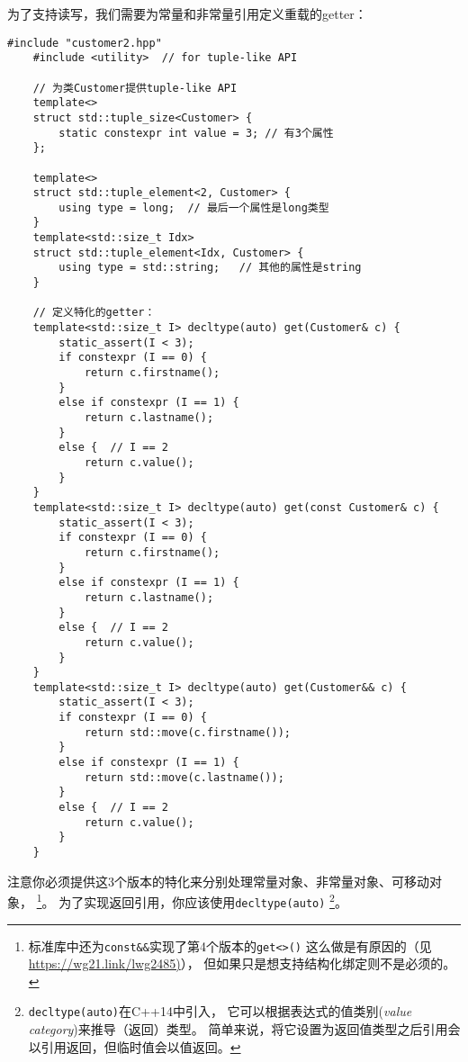 为了支持读写，我们需要为常量和非常量引用定义重载的getter：
\begin{lstlisting}[frame=single, title=lang/structbind2.hpp]
    #include "customer2.hpp"
    #include <utility>  // for tuple-like API

    // 为类Customer提供tuple-like API
    template<>
    struct std::tuple_size<Customer> {
        static constexpr int value = 3; // 有3个属性
    };

    template<>
    struct std::tuple_element<2, Customer> {
        using type = long;  // 最后一个属性是long类型
    }
    template<std::size_t Idx>
    struct std::tuple_element<Idx, Customer> {
        using type = std::string;   // 其他的属性是string
    }

    // 定义特化的getter：
    template<std::size_t I> decltype(auto) get(Customer& c) {
        static_assert(I < 3);
        if constexpr (I == 0) {
            return c.firstname();
        }
        else if constexpr (I == 1) {
            return c.lastname();
        }
        else {  // I == 2
            return c.value();
        }
    }
    template<std::size_t I> decltype(auto) get(const Customer& c) {
        static_assert(I < 3);
        if constexpr (I == 0) {
            return c.firstname();
        }
        else if constexpr (I == 1) {
            return c.lastname();
        }
        else {  // I == 2
            return c.value();
        }
    }
    template<std::size_t I> decltype(auto) get(Customer&& c) {
        static_assert(I < 3);
        if constexpr (I == 0) {
            return std::move(c.firstname());
        }
        else if constexpr (I == 1) {
            return std::move(c.lastname());
        }
        else {  // I == 2
            return c.value();
        }
    }
\end{lstlisting}
注意你必须提供这3个版本的特化来分别处理常量对象、非常量对象、可移动对象，
\footnote{标准库中还为\texttt{const\&\&}实现了第4个版本的\texttt{get<>()}
这么做是有原因的（见\url{https://wg21.link/lwg2485)}），
但如果只是想支持结构化绑定则不是必须的。}。
为了实现返回引用，你应该使用\texttt{decltype(auto)}
\footnote{\texttt{decltype(auto)}在C++14中引入，
它可以根据表达式的值类别(\emph{value category})来推导（返回）类型。
简单来说，将它设置为返回值类型之后引用会以引用返回，但临时值会以值返回。}。

